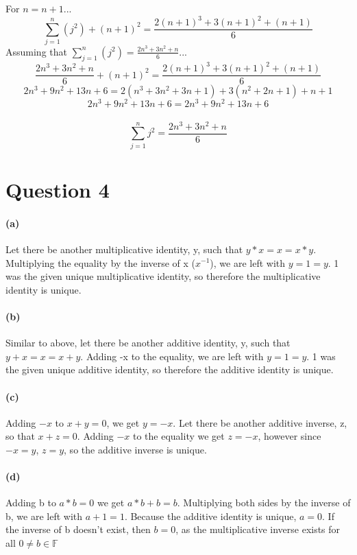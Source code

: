 \documentclass[10pt,letter]{article}
\begin{document}
For $n = n+1$...
$$\sum_{j=1}^{n}(j^2) + (n + 1)^2 = \frac{2(n+1)^3 + 3(n+1)^2 + (n+1)}{6}$$
Assuming that $\sum_{j=1}^{n}(j^2) = \frac{2n^3 + 3n^2 + n}{6}$...
$$\frac{2n^3 + 3n^2 + n}{6} + (n + 1)^2 = \frac{2(n+1)^3 + 3(n+1)^2 + (n+1)}{6}$$
$$2n^3 + 9n^2 + 13n + 6 = 2(n^3 + 3n^2 + 3n + 1) + 3(n^2 + 2n + 1) + n + 1$$
$$2n^3 + 9n^2 + 13n + 6 = 2n^3 + 9n^2 + 13n + 6$$\\ 
$$\sum_{j=1}^{n}j^2 =  \frac{2n^3 + 3n^2 + n}{6}$$
\hfill\blacksquare

\section*{Question 4}

\paragraph{(a)}
Let there be another multiplicative identity, y, such that $y * x = x = x * y$. Multiplying the equality by the inverse of x ($x^{-1}$), we are left with $y = 1 = y$. 1 was the given unique multiplicative identity, so therefore the multiplicative identity is unique. 

\paragraph{(b)}
Similar to above, let there be another additive identity, y, such that $y + x = x = x + y$. Adding -x to the equality, we are left with $y = 1 = y$. 1 was the given unique additive identity, so therefore the additive identity is unique. 

\paragraph{(c)} 
Adding $-x$ to $x + y = 0$, we get $y = -x$. Let there be another additive inverse, z, so that $x + z = 0$. Adding $-x$ to the equality we get $z = -x$, however since $-x = y$, $z = y$, so the additive inverse is unique. 

\paragraph{(d)} 
Adding b to $a*b = 0$ we get $a*b + b = b$. Multiplying both sides by the inverse of b, we are left with $a + 1 = 1$. Because the additive identity is unique, $a = 0$. If the inverse of b doesn't exist, then $b = 0$, as the multiplicative inverse exists for all $0 \neq b \in \mathbb{F}$
\end{document}
